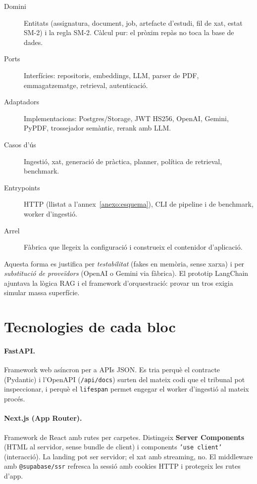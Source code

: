 \begin{description}
  \item[Domini] Entitats (assignatura, document, job, artefacte d'estudi, fil de xat, estat SM-2) i la regla SM-2. Càlcul pur: el pròxim repàs no toca la base de dades.
  \item[Ports] Interfícies: repositoris, embeddings, LLM, parser de PDF, emmagatzematge, retrieval, autenticació.
  \item[Adaptadors] Implementacions: Postgres/Storage, JWT HS256, OpenAI, Gemini, PyPDF, trossejador semàntic, rerank amb LLM.
  \item[Casos d'ús] Ingestió, xat, generació de pràctica, planner, política de retrieval, benchmark.
  \item[Entrypoints] HTTP (llistat a l'annex~\ref{anexo:esquema}), CLI de pipeline i de benchmark, worker d'ingestió.
  \item[Arrel] Fàbrica que llegeix la configuració i construeix el contenidor d'aplicació.
\end{description}

Aquesta forma es justifica per \emph{testabilitat} (fakes en memòria, sense xarxa) i per \emph{substitució de proveïdors} (OpenAI o Gemini via fàbrica). El prototip LangChain ajuntava la lògica RAG i el framework d'orquestració: provar un tros exigia simular massa superfície.

\section{Tecnologies de cada bloc}

\paragraph{FastAPI.}
Framework web asíncron per a APIs JSON. Es tria perquè el contracte (Pydantic) i l'OpenAPI (\texttt{/api/docs}) surten del mateix codi que el tribunal pot inspeccionar, i perquè el \texttt{lifespan} permet engegar el worker d'ingestió al mateix procés.

\paragraph{Next.js (App Router).}
Framework de React amb rutes per carpetes. Distingeix \textbf{Server Components} (HTML al servidor, sense bundle de client) i components \texttt{'use client'} (interacció). La landing pot ser servidor; el xat amb streaming, no. El middleware amb \texttt{@supabase/ssr} refresca la sessió amb cookies HTTP i protegeix les rutes d'app.

